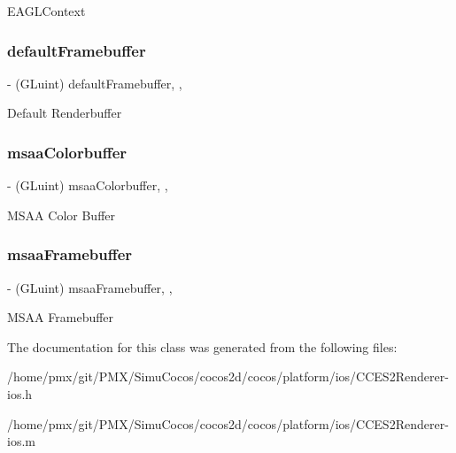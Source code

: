 E\+A\+G\+L\+Context \mbox{\label{interfaceCCES2Renderer_a4159c6abad021130485922326db78d12}} 
\subsubsection{\texorpdfstring{default\+Framebuffer}{defaultFramebuffer}}
{\footnotesize\ttfamily -\/ (G\+Luint) default\+Framebuffer\hspace{0.3cm}{\ttfamily [read]}, {\ttfamily [nonatomic]}, {\ttfamily [assign]}}

Default Renderbuffer \mbox{\label{interfaceCCES2Renderer_a85fedfac8dd06c6e2f24c33d7bc083d3}} 
\subsubsection{\texorpdfstring{msaa\+Colorbuffer}{msaaColorbuffer}}
{\footnotesize\ttfamily -\/ (G\+Luint) msaa\+Colorbuffer\hspace{0.3cm}{\ttfamily [read]}, {\ttfamily [nonatomic]}, {\ttfamily [assign]}}

M\+S\+AA Color Buffer \mbox{\label{interfaceCCES2Renderer_a5c283af5a41b77b73715279ef8ffa6ff}} 
\subsubsection{\texorpdfstring{msaa\+Framebuffer}{msaaFramebuffer}}
{\footnotesize\ttfamily -\/ (G\+Luint) msaa\+Framebuffer\hspace{0.3cm}{\ttfamily [read]}, {\ttfamily [nonatomic]}, {\ttfamily [assign]}}

M\+S\+AA Framebuffer 

The documentation for this class was generated from the following files\+:\begin{DoxyCompactItemize}
\item 
/home/pmx/git/\+P\+M\+X/\+Simu\+Cocos/cocos2d/cocos/platform/ios/C\+C\+E\+S2\+Renderer-\/ios.\+h\item 
/home/pmx/git/\+P\+M\+X/\+Simu\+Cocos/cocos2d/cocos/platform/ios/C\+C\+E\+S2\+Renderer-\/ios.\+m\end{DoxyCompactItemize}

